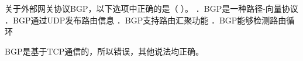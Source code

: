 \question 关于外部网关协议BGP，以下选项中正确的是（ ）。 ．BGP是一种路径-向量协议
．BGP通过UDP发布路由信息 ．BGP支持路由汇聚功能 ．BGP能够检测路由循环
\par{}
\begin{solution}BGP是基于TCP通信的，所以错误，其他说法均正确。
\end{solution}
